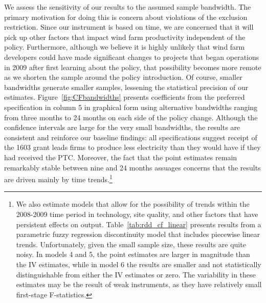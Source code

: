 \documentclass[12pt]{article}
\begin{document}
We assess the sensitivity of our results to the assumed sample bandwidth. The primary motivation for doing this is concern about violations of the exclusion restriction. Since our instrument is based on time, we are concerned that it will pick up other factors that impact wind farm productivity independent of the policy. Furthermore, although we believe it is highly unlikely that wind farm developers could have made significant changes to projects that began operations in 2009 after first learning about the policy, that possibility becomes more remote as we shorten the sample around the policy introduction. Of course, smaller bandwidths generate smaller samples, lessening the statistical precision of our estimates. Figure~\ref{fig:CFbandwidths} presents coefficients from the preferred specification in column 5 in graphical form using alternative bandwidths ranging from three months to 24 months on each side of the policy change. Although the confidence intervals are large for the very small bandwidths, the results are consistent and reinforce our baseline findings: all specifications suggest receipt of the 1603 grant leads firms to produce less electricity than they would have if they had received the PTC. Moreover, the fact that the point estimates remain remarkably stable between nine and 24 months assuages concerns that the results are driven mainly by time trends.\footnote{We also estimate models that allow for the possibility of trends within the 2008-2009 time period in technology, site quality, and other factors that have persistent effects on output. Table~\ref{tab:rdd_cf_linear} presents results from a parametric fuzzy regression discontinuity model that includes piecewise linear trends. Unfortunately, given the small sample size, these results are quite noisy. In models 4 and 5, the point estimates are larger in magnitude than the IV estimates, while in model 6 the results are smaller and not statistically distinguishable from either the IV estimates or zero. The variability in these estimates may be the result of weak instruments, as they have relatively small first-stage F-statistics.}
\end{document}
